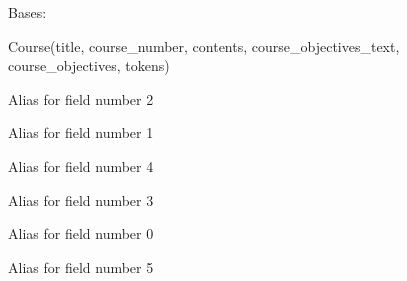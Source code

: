 \documentclass[letterpaper,10pt,english]{sphinxmanual}
\begin{document}
\begin{fulllineitems}
\label{cv_kickstarter:cv_kickstarter.course_repository.Course}
Bases: 

Course(title, course\_number, contents, course\_objectives\_text, course\_objectives, tokens)

\begin{fulllineitems}
\label{cv_kickstarter:cv_kickstarter.course_repository.Course.contents}
Alias for field number 2

\end{fulllineitems}


\begin{fulllineitems}
\label{cv_kickstarter:cv_kickstarter.course_repository.Course.course_number}
Alias for field number 1

\end{fulllineitems}


\begin{fulllineitems}
\label{cv_kickstarter:cv_kickstarter.course_repository.Course.course_objectives}
Alias for field number 4

\end{fulllineitems}


\begin{fulllineitems}
\label{cv_kickstarter:cv_kickstarter.course_repository.Course.course_objectives_text}
Alias for field number 3

\end{fulllineitems}


\begin{fulllineitems}
\label{cv_kickstarter:cv_kickstarter.course_repository.Course.title}
Alias for field number 0

\end{fulllineitems}


\begin{fulllineitems}
\label{cv_kickstarter:cv_kickstarter.course_repository.Course.tokens}
Alias for field number 5

\end{fulllineitems}


\end{fulllineitems}
\end{document}
